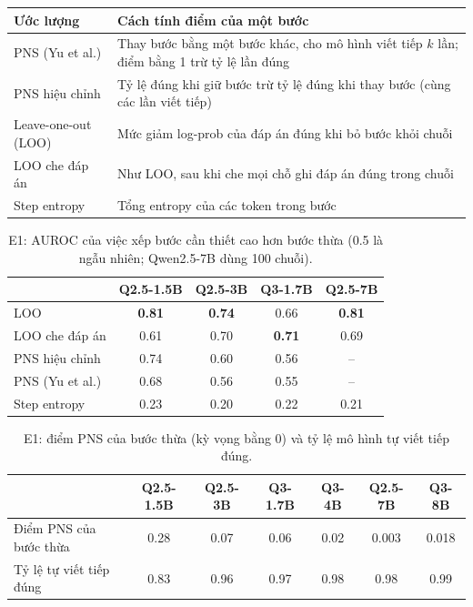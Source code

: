 \documentclass[11pt]{article}
\begin{document}
\begin{table}[h]
\centering\small
\begin{tabularx}{\linewidth}{@{}l>{\raggedright\arraybackslash}X@{}}
\toprule
Ước lượng & Cách tính điểm của một bước \\
\midrule
PNS (Yu et al.) & Thay bước bằng một bước khác, cho mô hình viết tiếp $k$ lần; điểm bằng 1 trừ tỷ lệ lần đúng \\
PNS hiệu chỉnh & Tỷ lệ đúng khi giữ bước trừ tỷ lệ đúng khi thay bước (cùng các lần viết tiếp) \\
Leave-one-out (LOO) & Mức giảm log-prob của đáp án đúng khi bỏ bước khỏi chuỗi \\
LOO che đáp án & Như LOO, sau khi che mọi chỗ ghi đáp án đúng trong chuỗi \\
Step entropy & Tổng entropy của các token trong bước \\
\bottomrule
\end{tabularx}
\end{table}

\begin{table}[h]
\centering\small
\caption{E1: AUROC của việc xếp bước cần thiết cao hơn bước thừa (0.5 là ngẫu nhiên; Qwen2.5-7B dùng 100 chuỗi).}
\begin{tabular}{lcccc}
\toprule
 & Q2.5-1.5B & Q2.5-3B & Q3-1.7B & Q2.5-7B \\
\midrule
LOO & \textbf{0.81} & \textbf{0.74} & 0.66 & \textbf{0.81} \\
LOO che đáp án & 0.61 & 0.70 & \textbf{0.71} & 0.69 \\
PNS hiệu chỉnh & 0.74 & 0.60 & 0.56 & -- \\
PNS (Yu et al.) & 0.68 & 0.56 & 0.55 & -- \\
Step entropy & 0.23 & 0.20 & 0.22 & 0.21 \\
\bottomrule
\end{tabular}
\end{table}

\begin{table}[h]
\centering\small
\caption{E1: điểm PNS của bước thừa (kỳ vọng bằng 0) và tỷ lệ mô hình tự viết tiếp đúng.}
\begin{tabular}{lcccccc}
\toprule
 & Q2.5-1.5B & Q2.5-3B & Q3-1.7B & Q3-4B & Q2.5-7B & Q3-8B \\
\midrule
Điểm PNS của bước thừa & 0.28 & 0.07 & 0.06 & 0.02 & 0.003 & 0.018 \\
Tỷ lệ tự viết tiếp đúng & 0.83 & 0.96 & 0.97 & 0.98 & 0.98 & 0.99 \\
\bottomrule
\end{tabular}
\end{table}
\end{document}

